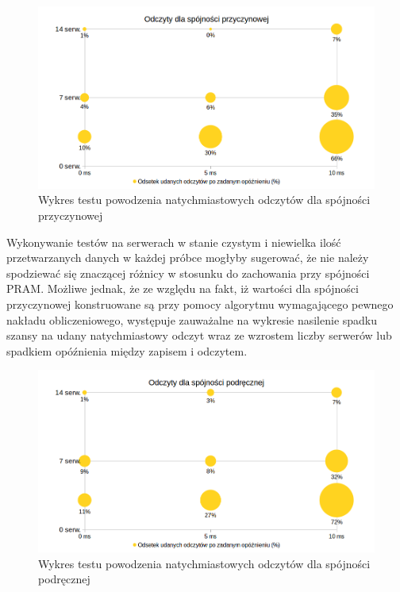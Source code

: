 \begin{figure}[H]
    \includegraphics[width=\linewidth]{images/graphs/caus.png}
    \caption{Wykres testu powodzenia natychmiastowych odczytów dla spójności przyczynowej}
    \label{figure:causgraph}
\end{figure}

Wykonywanie testów na serwerach w stanie czystym i niewielka ilość przetwarzanych danych w każdej próbce mogłyby sugerować, że nie należy spodziewać się znaczącej różnicy w stosunku do zachowania przy spójności PRAM. Możliwe jednak, że ze względu na fakt, iż wartości dla spójności przyczynowej konstruowane są przy pomocy algorytmu wymagającego pewnego nakładu obliczeniowego, występuje zauważalne na wykresie nasilenie spadku szansy na udany natychmiastowy odczyt wraz ze wzrostem liczby serwerów lub spadkiem opóźnienia między zapisem i odczytem.

\begin{figure}[H]
    \includegraphics[width=\linewidth]{images/graphs/cache.png}
    \caption{Wykres testu powodzenia natychmiastowych odczytów dla spójności podręcznej}
    \label{figure:cachegraph}
\end{figure}

